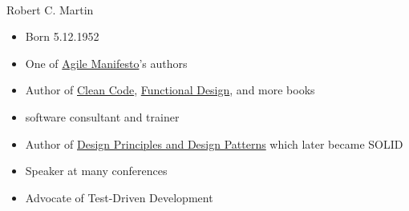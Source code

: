 \documentclass[calcdimensions,landscape,letterpaper]{powersem}
\newcommand{\thecurrentheading}{}
\newcommand{\heading}[1]{\renewcommand{\thecurrentheading}{#1}}
\begin{document}
\begin{slide}
  \heading{Robert C. Martin aka "Uncle Bob"}
  \begin{center}
    \begin{minipage}[c]{.4\textwidth}
      \begin{center}
        \\
        Robert C. Martin
      \end{center}
    \end{minipage}
    \begin{minipage}[c]{.55\textwidth}
      \begin{itemize}
        \item Born 5.12.1952
        \item One of \href{https://agilemanifesto.org/}{Agile Manifesto}'s authors
        \item Author of \href{https://www.informit.com/store/clean-code-a-handbook-of-agile-software-craftsmanship-9780132350884}{Clean Code}, \href{https://www.informit.com/store/functional-design-principles-patterns-and-practices-9780138176396}{Functional Design}, and more books
        \item software consultant and trainer
        \item Author of \href{https://web.archive.org/web/20150906155800/http://www.objectmentor.com/resources/articles/Principles_and_Patterns.pdf}{Design Principles and Design Patterns} which later became SOLID
        \item Speaker at many conferences
        \item Advocate of Test-Driven Development
      \end{itemize}
    \end{minipage}
  \end{center}
\end{slide}
\end{document}
